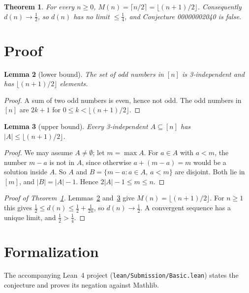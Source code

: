 \documentclass[11pt]{article}
\theoremstyle{plain}
\newtheorem{theorem}{Theorem}
\newtheorem{lemma}[theorem]{Lemma}
\theoremstyle{definition}
\theoremstyle{remark}
\begin{document}
\begin{theorem}\label{thm:main}
For every $n\ge0$, $M(n)=\lceil n/2\rceil=\lfloor (n+1)/2\rfloor$. Consequently
$d(n)\to\frac12$, so $d(n)$ has no limit $\le\frac14$, and Conjecture 00000002040
is false.
\end{theorem}

\section{Proof}

\begin{lemma}[lower bound]\label{lem:odd}
The set of odd numbers in $[n]$ is 3-independent and has
$\lfloor(n+1)/2\rfloor$ elements.
\end{lemma}

\begin{proof}
A sum of two odd numbers is even, hence not odd. The odd numbers in $[n]$ are
$2k+1$ for $0\le k<\lfloor(n+1)/2\rfloor$.
\end{proof}

\begin{lemma}[upper bound]\label{lem:upper}
Every 3-independent $A\subseteq[n]$ has $|A|\le\lfloor(n+1)/2\rfloor$.
\end{lemma}

\begin{proof}
We may assume $A\ne\emptyset$; let $m=\max A$. For $a\in A$ with $a<m$, the
number $m-a$ is not in $A$, since otherwise $a+(m-a)=m$ would be a solution
inside $A$. So $A$ and $B=\{m-a : a\in A,\ a<m\}$ are disjoint. Both lie in
$[m]$, and $|B|=|A|-1$. Hence $2|A|-1\le m\le n$.
\end{proof}

\begin{proof}[Proof of Theorem~\ref{thm:main}]
Lemmas~\ref{lem:odd} and~\ref{lem:upper} give $M(n)=\lfloor (n+1)/2\rfloor$.
For $n\ge1$ this gives $\frac12\le d(n)\le\frac12+\frac1{2n}$, so $d(n)\to\frac12$. A
convergent sequence has a unique limit, and $\frac12>\frac14$.
\end{proof}

\section{Formalization}

The accompanying Lean~4 project (\texttt{lean/Submission/Basic.lean}) states
the conjecture and proves its negation against Mathlib.
\end{document}
